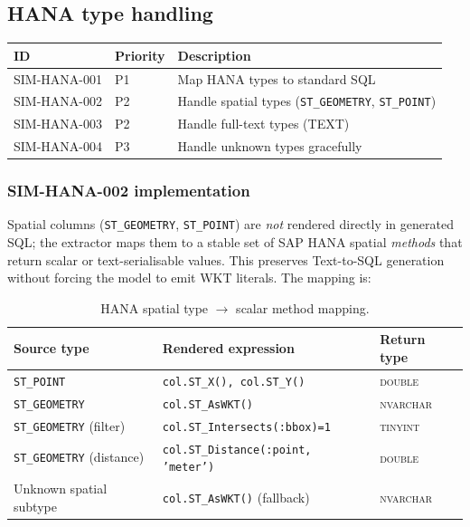 \documentclass[12pt,a4paper,twoside]{report}
\begin{document}
\subsection{HANA type handling}

\begin{tabularx}{\linewidth}{@{}l l X@{}}
\toprule
\textbf{ID} & \textbf{Priority} & \textbf{Description} \\ \midrule
SIM-HANA-001 & P1 & Map HANA types to standard SQL \\
SIM-HANA-002 & P2 & Handle spatial types (\texttt{ST\_GEOMETRY}, \texttt{ST\_POINT}) \\
SIM-HANA-003 & P2 & Handle full-text types (TEXT) \\
SIM-HANA-004 & P3 & Handle unknown types gracefully \\
\bottomrule
\end{tabularx}

\subsubsection{SIM-HANA-002 implementation}

Spatial columns (\texttt{ST\_GEOMETRY}, \texttt{ST\_POINT}) are \emph{not}
rendered directly in generated SQL; the extractor maps them to a stable set
of SAP HANA spatial \emph{methods} that return scalar or text-serialisable
values. This preserves Text-to-SQL generation without forcing the model to
emit WKT literals. The mapping is:

\begin{table}[H]
\centering\footnotesize
\caption{HANA spatial type $\to$ scalar method mapping.}
\label{tab:sim-hana-spatial-mapping}
\begin{tabularx}{\linewidth}{@{}l l X@{}}
\toprule
\textbf{Source type} & \textbf{Rendered expression} & \textbf{Return type} \\ \midrule
\texttt{ST\_POINT} & \texttt{col.ST\_X(), col.ST\_Y()} & \textsc{double} \\
\texttt{ST\_GEOMETRY} & \texttt{col.ST\_AsWKT()} & \textsc{nvarchar} \\
\texttt{ST\_GEOMETRY} (filter) & \texttt{col.ST\_Intersects(:bbox)=1} & \textsc{tinyint} \\
\texttt{ST\_GEOMETRY} (distance) & \texttt{col.ST\_Distance(:point, 'meter')} & \textsc{double} \\
Unknown spatial subtype & \texttt{col.ST\_AsWKT()} (fallback) & \textsc{nvarchar} \\
\bottomrule
\end{tabularx}
\end{table}
\end{document}
